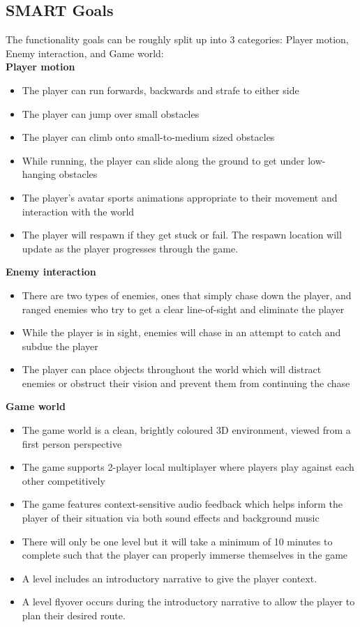 \documentclass[a4paper,10pt]{article}
\begin{document}
\subsection{SMART Goals} \label{goals}
The functionality goals can be roughly split up into 3 categories: Player motion, Enemy interaction, and Game world:\\
\textbf{Player motion}
\begin{itemize}
	\item The player can run forwards, backwards and strafe to either side
	\item The player can jump over small obstacles
	\item The player can climb onto small-to-medium sized obstacles
	\item While running, the player can slide along the ground to get under low-hanging obstacles
	\item The player's avatar sports animations appropriate to their movement and interaction with the world
	\item The player will respawn if they get stuck or fail. The respawn location will update as the player progresses through the game.
\end{itemize}
\textbf{Enemy interaction}
\begin{itemize}
	\item There are two types of enemies, ones that simply chase down the player, and ranged enemies who try to get a clear line-of-sight and eliminate the player
	\item While the player is in sight, enemies will chase in an attempt to catch and subdue the player
	\item The player can place objects throughout the world which will distract enemies or obstruct their vision and prevent them from continuing the chase
\end{itemize}
\textbf{Game world}
\begin{itemize}
	\item The game world is a clean, brightly coloured 3D environment, viewed from a first person perspective
	\item The game supports 2-player local multiplayer where players play against each other competitively
	\item The game features context-sensitive audio feedback which helps inform the player of their situation via both sound effects and background music
	\item There will only be one level but it will take a minimum of 10 minutes to complete such that the player can properly immerse themselves in the game
    \item A level includes an introductory narrative to give the player context.
    \item A level flyover occurs during the introductory narrative to allow the player to plan their desired route.
\end{itemize}
\end{document}
